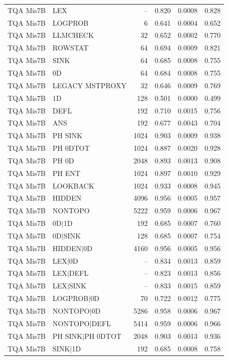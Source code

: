 \begin{longtable}{llrrrr}
TQA Mis7B & LEX & -- & 0.820 & 0.0008 & 0.828 \\
TQA Mis7B & LOGPROB & 6 & 0.641 & 0.0004 & 0.652 \\
TQA Mis7B & LLMCHECK & 32 & 0.652 & 0.0002 & 0.770 \\
TQA Mis7B & ROWSTAT & 64 & 0.694 & 0.0009 & 0.821 \\
TQA Mis7B & SINK & 64 & 0.685 & 0.0008 & 0.755 \\
TQA Mis7B & 0D & 64 & 0.684 & 0.0008 & 0.755 \\
TQA Mis7B & LEGACY MSTPROXY & 32 & 0.646 & 0.0009 & 0.769 \\
TQA Mis7B & 1D & 128 & 0.501 & 0.0000 & 0.499 \\
TQA Mis7B & DEFL & 192 & 0.710 & 0.0015 & 0.756 \\
TQA Mis7B & ANS & 192 & 0.677 & 0.0043 & 0.704 \\
TQA Mis7B & PH SINK & 1024 & 0.903 & 0.0009 & 0.938 \\
TQA Mis7B & PH 0DTOT & 1024 & 0.887 & 0.0020 & 0.928 \\
TQA Mis7B & PH 0D & 2048 & 0.893 & 0.0013 & 0.908 \\
TQA Mis7B & PH ENT & 1024 & 0.897 & 0.0010 & 0.929 \\
TQA Mis7B & LOOKBACK & 1024 & 0.933 & 0.0008 & 0.945 \\
TQA Mis7B & HIDDEN & 4096 & 0.956 & 0.0005 & 0.957 \\
TQA Mis7B & NONTOPO & 5222 & 0.959 & 0.0006 & 0.967 \\
TQA Mis7B & 0D$\mid$1D & 192 & 0.685 & 0.0007 & 0.760 \\
TQA Mis7B & 0D$\mid$SINK & 128 & 0.685 & 0.0007 & 0.754 \\
TQA Mis7B & HIDDEN$\mid$0D & 4160 & 0.956 & 0.0005 & 0.956 \\
TQA Mis7B & LEX$\mid$0D & -- & 0.834 & 0.0013 & 0.859 \\
TQA Mis7B & LEX$\mid$DEFL & -- & 0.823 & 0.0013 & 0.856 \\
TQA Mis7B & LEX$\mid$SINK & -- & 0.833 & 0.0015 & 0.859 \\
TQA Mis7B & LOGPROB$\mid$0D & 70 & 0.722 & 0.0012 & 0.775 \\
TQA Mis7B & NONTOPO$\mid$0D & 5286 & 0.958 & 0.0006 & 0.967 \\
TQA Mis7B & NONTOPO$\mid$DEFL & 5414 & 0.959 & 0.0006 & 0.966 \\
TQA Mis7B & PH SINK$\mid$PH 0DTOT & 2048 & 0.903 & 0.0013 & 0.936 \\
TQA Mis7B & SINK$\mid$1D & 192 & 0.685 & 0.0008 & 0.758 \\

\end{longtable}
